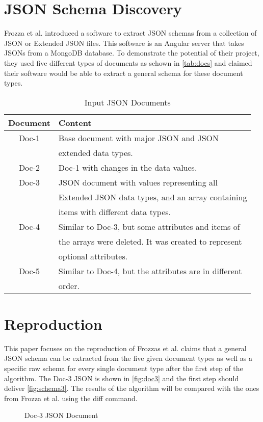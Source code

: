 \documentclass[sigconf, nonacm]{acmart}
\begin{document}
\section{JSON Schema Discovery}
Frozza et al. \cite{SchemaExtraction} introduced a software to extract JSON schemas from a collection of JSON or Extended JSON files. This software is an Angular server that takes JSONs from a MongoDB database. To demonstrate the potential of their project, they used five different types of documents as schown in \autoref{tab:docs} and claimed their software would be able to extract a general schema for these document types. 
\begin{table}[h]%
	\caption{Input JSON Documents}
	\label{tab:docs}
	\begin{tabular}{cl}
		\toprule
		Document & Content \\
		\midrule
		Doc-1 & Base document with major JSON and JSON \\
		& extended data types. \\
		Doc-2 & Doc-1 with changes in the data values. \\
		Doc-3 & JSON document with values representing all \\
		& Extended JSON data types, and an array containing \\
		& items with different data types. \\
		Doc-4 & Similar to Doc-3, but some attributes and items of \\
		& the arrays were deleted. It was created to represent \\
		& optional attributes. \\
		Doc-5 & Similar to Doc-4, but the attributes are in different \\
		& order. \\
		\bottomrule
	\end{tabular}
\end{table}

\section{Reproduction}
This paper focuses on the reproduction of Frozzas et al. \cite{SchemaExtraction} claims that a general JSON schema can be extracted from the five given document types as well as a specific raw schema for every single document type after the first step of the algorithm. The Doc-3 JSON is shown in \autoref{fig:doc3} and the first step should deliver \autoref{fig:schema3}. The results of the algorithm will be compared with the ones from Frozza et al. using the diff command.
\begin{figure}[t]
	\centering
	\caption{Doc-3 JSON Document}
	\label{fig:doc3}
	
\end{figure}
\end{document}
